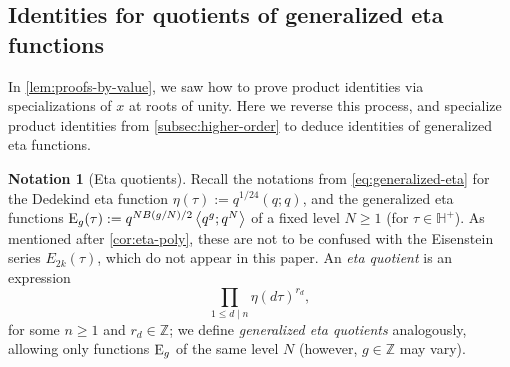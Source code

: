 \documentclass[reqno,11pt]{amsart}
\theoremstyle{definition}
\newtheorem{notation}[theorem]{Notation}
\theoremstyle{remark}
\numberwithin{equation}{section}
\newcommand{\Z}{\mathbb{Z}}
\renewcommand{\H}{{\mathbb{H}}}
\newcommand{\E}{\textnormal E}
\newcommand{\la}{\left\langle}
\newcommand{\ra}{\right\rangle}
\begin{document}
\subsection{Identities for quotients of generalized eta functions} \label{subsec:generalized-eta}
In \cref{lem:proofs-by-value}, we saw how to prove product identities via specializations of $x$ at roots of unity. Here we reverse this process, and specialize product identities from \cref{subsec:higher-order} to deduce identities of generalized eta functions. 

\begin{notation}[Eta quotients] \label{not:eta} 
Recall the notations from \cref{eq:generalized-eta} for the Dedekind eta function $\eta(\tau) := q^{1/24} (q; q)$, and the generalized eta functions $\E_g(\tau) := q^{N B(g/N)/2}\la q^g; q^N \ra$ of a fixed level $N \ge 1$ (for $\tau \in \H^+$). As mentioned after \cref{cor:eta-poly}, these are not to be confused with the Eisenstein series $E_{2k}(\tau)$, which do not appear in this paper. An \emph{eta quotient} \cite{gordon1993multiplicative,martin1997eta} is an expression
\[
    \prod_{1 \le d \mid n} \eta(d\tau)^{r_d},
\]
for some $n \ge 1$ and $r_d \in \Z$; we define \emph{generalized eta quotients} analogously, allowing only functions $\E_g$ of the same level $N$ (however, $g \in \Z$ may vary).
\end{notation}
\end{document}
